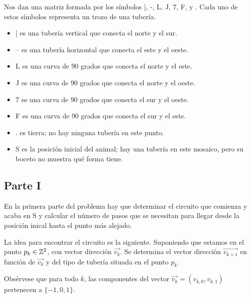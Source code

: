 \documentclass[a4paper,12pt]{article}
\begin{document}
Nos dan una matriz formada por los símbolos |, -, L, J, 7, F, y . Cada uno de estos símbolos representa un trozo de una tubería.

\begin{itemize}[label=$\bullet$]
    \item | es una tubería vertical que conecta el norte y el sur.
    \item -- es una tubería horizontal que conecta el este y el oeste.
    \item L es una curva de 90 grados que conecta el norte y el este.
    \item J es una curva de 90 grados que conecta el norte y el oeste.
    \item 7 es una curva de 90 grados que conecta el sur y el oeste.
    \item F es una curva de 90 grados que conecta el sur y el este.
    \item . es tierra; no hay ninguna tubería en este punto.
    \item S es la posición inicial del animal; hay una tubería en este mosaico, pero su boceto no muestra qué forma tiene.

\end{itemize}

\subsection{Parte I}
En la primera parte del problema hay que determinar el circuito que comienza y acaba en S y calcular el número de pasos que se necesitan para llegar desde la posición inical hasta el punto más alejado.

La idea para encontrar el circuito es la siguiente. Suponiendo que estamos en el punto $p_k\in\mathbb{Z}^2$, con vector dirección $\vec{v_k}$. Se determina el vector dirección $\vec{v_{k+1}}$ en función de $\vec{v_k}$ y del tipo de tubería situada en el punto $p_k$.

Obsérvese que para todo $k$, las componentes del vector $\vec{v_k}=(v_{k,0}, v_{k,1})$ pertenecen a $\{-1,0,1\}$.
\end{document}
